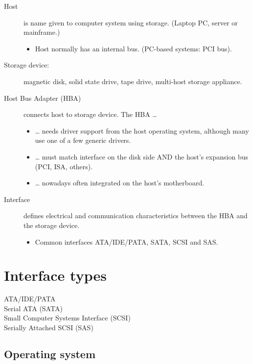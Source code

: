 \documentclass[slides]{pgnotes}
\begin{document}
\begin{description}
\item[Host]
is name given to computer system using storage. (Laptop PC, server or
mainframe.)

\begin{itemize}

\item
  Host normally has an internal bus. (PC-based systems: PCI bus).
\end{itemize}
\item[Storage device:]
magnetic disk, solid state drive, tape drive, multi-host storage
appliance.
\item[Host Bus Adapter (HBA)]
connects host to storage device. The HBA \ldots{}

\begin{itemize}
\item
  \ldots{} needs driver support from the host operating system, although
  many use one of a few generic drivers.
\item
  \ldots{} must match interface on the disk side AND the host's
  expansion bus (PCI, ISA, others).
\item
  \ldots{} nowadays often integrated on the host's motherboard.
\end{itemize}
\item[Interface]
defines electrical and communication characteristics between the HBA and
the storage device.

\begin{itemize}

\item
  Common interfaces ATA/IDE/PATA, SATA, SCSI and SAS.
\end{itemize}
\end{description}

\section{Interface types}\label{interface-types}

\begin{description}
\item[ATA/IDE/PATA]
\item[Serial ATA (SATA)]
\item[Small Computer Systems Interface (SCSI)]
\item[Serially Attached SCSI (SAS)]
\end{description}

\subsection{Operating system}\label{operating-system}
\end{document}

